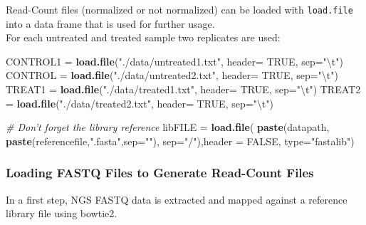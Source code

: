 \documentclass[]{article}
\newenvironment{Shaded}{\begin{snugshade}}{\end{snugshade}}
\newcommand{\KeywordTok}[1]{\textcolor[rgb]{0.13,0.29,0.53}{\textbf{{#1}}}}
\newcommand{\DataTypeTok}[1]{\textcolor[rgb]{0.13,0.29,0.53}{{#1}}}
\newcommand{\CharTok}[1]{\textcolor[rgb]{0.31,0.60,0.02}{{#1}}}
\newcommand{\StringTok}[1]{\textcolor[rgb]{0.31,0.60,0.02}{{#1}}}
\newcommand{\CommentTok}[1]{\textcolor[rgb]{0.56,0.35,0.01}{\textit{{#1}}}}
\newcommand{\OtherTok}[1]{\textcolor[rgb]{0.56,0.35,0.01}{{#1}}}
\newcommand{\NormalTok}[1]{{#1}}
\begin{document}
Read-Count files (normalized or not normalized) can be loaded with
\texttt{load.file} into a data frame that is used for further usage.\\
For each untreated and treated sample two replicates are used:

\begin{Shaded}
\begin{Highlighting}[]
\NormalTok{CONTROL1 =}\StringTok{ }\KeywordTok{load.file}\NormalTok{(}\StringTok{"./data/untreated1.txt"}\NormalTok{, }\DataTypeTok{header=} \OtherTok{TRUE}\NormalTok{, }\DataTypeTok{sep=}\StringTok{"}\CharTok{\textbackslash{}t}\StringTok{"}\NormalTok{)}
\NormalTok{CONTROL =}\StringTok{ }\KeywordTok{load.file}\NormalTok{(}\StringTok{"./data/untreated2.txt"}\NormalTok{, }\DataTypeTok{header=} \OtherTok{TRUE}\NormalTok{, }\DataTypeTok{sep=}\StringTok{"}\CharTok{\textbackslash{}t}\StringTok{"}\NormalTok{)}
\NormalTok{TREAT1 =}\StringTok{ }\KeywordTok{load.file}\NormalTok{(}\StringTok{"./data/treated1.txt"}\NormalTok{, }\DataTypeTok{header=} \OtherTok{TRUE}\NormalTok{, }\DataTypeTok{sep=}\StringTok{"}\CharTok{\textbackslash{}t}\StringTok{"}\NormalTok{)}
\NormalTok{TREAT2 =}\StringTok{ }\KeywordTok{load.file}\NormalTok{(}\StringTok{"./data/treated2.txt"}\NormalTok{, }\DataTypeTok{header=} \OtherTok{TRUE}\NormalTok{, }\DataTypeTok{sep=}\StringTok{"}\CharTok{\textbackslash{}t}\StringTok{"}\NormalTok{)}

\CommentTok{# Don't forget the library reference}
\NormalTok{libFILE =}\StringTok{ }\KeywordTok{load.file}\NormalTok{(}
  \KeywordTok{paste}\NormalTok{(datapath, }\KeywordTok{paste}\NormalTok{(referencefile,}\StringTok{".fasta"}\NormalTok{,}\DataTypeTok{sep=}\StringTok{""}\NormalTok{), }\DataTypeTok{sep=}\StringTok{"/"}\NormalTok{),}\DataTypeTok{header =} \OtherTok{FALSE}\NormalTok{,}
  \DataTypeTok{type=}\StringTok{"fastalib"}\NormalTok{)}
\end{Highlighting}
\end{Shaded}

\subsubsection{Loading FASTQ Files to Generate Read-Count
Files}\label{loading-fastq-files-to-generate-read-count-files}

In a first step, NGS FASTQ data is extracted and mapped against a
reference library file using bowtie2.
\end{document}
